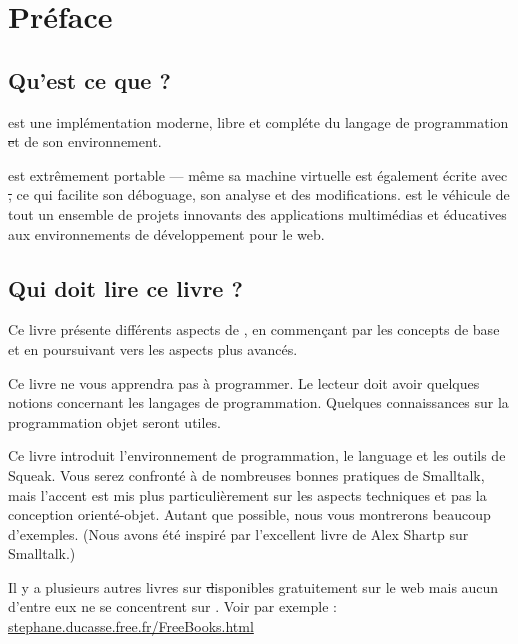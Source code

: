 \documentclass[a4paper,10pt,twoside]{book}
\begin{document}
\fi
\renewcommand{\nnbb}[2]{} %
\sloppy
\chapter{Pr\'eface}\label{cha:intro}

\section*{Qu'est ce que \sq ?}

\sq est une impl\'ementation moderne, libre et compl\'ete du langage de programmation \st et de son environnement.

\sq est extr\^emement portable --- m\^eme sa machine virtuelle est \'egalement \'ecrite avec \st, ce qui facilite son d\'eboguage, son analyse et des modifications. \sq est le v\'ehicule de tout un ensemble de projets innovants des applications multim\'edias et \'educatives aux environnements de d\'eveloppement pour le web.

\section*{Qui doit lire ce livre ?}

Ce livre pr\'esente diff\'erents aspects de \sq, en commen\c{c}ant par les concepts de base et en poursuivant vers les aspects plus avanc\'es.

Ce livre ne vous apprendra pas \`a programmer. Le lecteur doit avoir quelques notions concernant les langages de programmation. Quelques connaissances sur la programmation objet seront utiles.

Ce livre introduit l'environnement de programmation, le language et les outils de Squeak. Vous serez confront\'e \`a de nombreuses bonnes pratiques de Smalltalk, mais l'accent est mis plus particuli\`erement sur les aspects techniques et pas la conception orient\'e-objet. Autant que possible, nous vous montrerons beaucoup d'exemples. (Nous avons \'et\'e inspir\'e par l'excellent livre de Alex Shartp sur Smalltalk\cite{Shar97a}.)

Il y a plusieurs autres livres sur \st disponibles gratuitement sur  le web mais aucun d'entre eux ne se concentrent sur \sq. Voir par exemple :
\url{stephane.ducasse.free.fr/FreeBooks.html}
\end{document}

